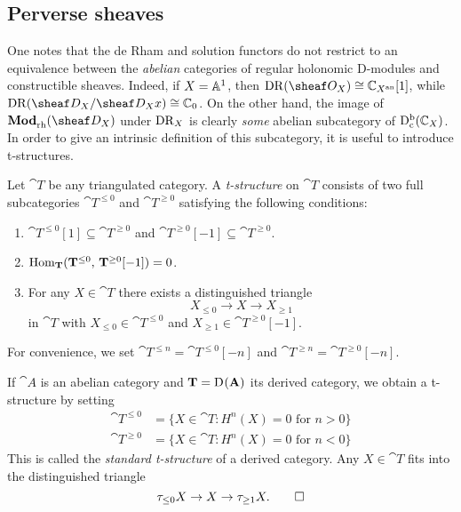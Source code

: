 \documentclass[number-in-sections,a4paper]{notes}
\begin{document}
\subsection{Perverse sheaves}

One notes that the de Rham and solution functors do not restrict to an equivalence between the \emph{abelian} categories of regular holonomic D-modules and constructible sheaves.
Indeed, if $X = \mathbb A^{1}_{}$, then $\DR(\sO_X) \cong \CC_{X^\an}[1]$, while $\DR(\sD_X/\sD_Xx) \cong \CC_0$.
On the other hand, the image of $\catDModrh{X}$ under $\operatorname{DR}_X$ is clearly \emph{some} abelian subcategory of $\mathrm{D}^{\mathrm{b}}_{\mathrm{c}}({\mathbb{C}}_{X})$.
In order to give an intrinsic definition of this subcategory, it is useful to introduce t-structures.

\begin{Definition}
    Let $\cat T$ be any triangulated category.
    A \emph{t-structure} on $\cat T$ consists of two full subcategories $\cat T^{\le 0}$ and $\cat T^{\ge 0}$ satisfying the following conditions:
    \begin{enumerate}
        \item $\cat T^{\le 0}[1] \subseteq \cat T^{\ge 0}$ and $\cat T^{\ge 0}[-1] \subseteq \cat T^{\ge 0}$.
        \item $\operatorname{Hom}_{\mathbf T}(\mathbf T^{\le 0}, \, \mathbf T^{\ge 0}[-1]) = 0$.
        \item For any $X \in \cat T$ there exists a distinguished triangle
            \[
                X_{\le 0} \to X \to X_{\ge 1}
            \]
            in $\cat T$ with $X_{\le 0} \in \cat T^{\le 0}$ and $X_{\ge 1} \in \cat T^{\ge 0}[-1]$.
    \end{enumerate}
    For convenience, we set $\cat T^{\le n} = \cat T^{\le 0}[-n]$ and $\cat T^{\ge n} = \cat T^{\ge 0}[-n]$.
\end{Definition}

\begin{Example}
    If $\cat A$ is an abelian category and $\mathbf T = \mathrm{D}^{}(\mathbf A)$ its derived category, we obtain a t-structure by setting
    \begin{align*}
        \cat T^{\le 0} & = \bigl\{ X \in \cat T : H^n(X) = 0 \text{ for } n > 0 \bigr\} \\
        \cat T^{\ge 0} & = \bigl\{ X \in \cat T : H^n(X) = 0 \text{ for } n < 0 \bigr\} 
    \end{align*}
    This is called the \emph{standard t-structure} of a derived category.
    Any $X \in \cat T$ fits into the distinguished triangle
    \[
        \tau_{\le 0} X \to X \to \tau_{\ge 1} X.
        \qedhere
    \]
\end{Example}
\end{document}
